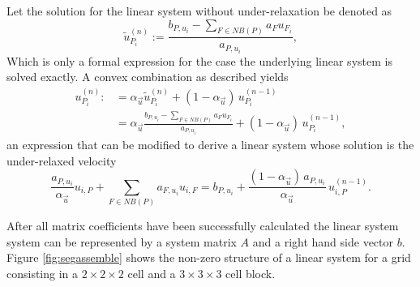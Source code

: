     Let  the solution for the linear system without under-relaxation be denoted as
    \begin{displaymath}
      \tilde{u}_{P_i}^{(n)} := \frac{b_{P,u_i} - \sum_{F \in NB(P)} a_F u_{F_i}}{a_{P,u_i}},
    \end{displaymath}
    Which is only a formal expression for the case the underlying linear system is solved exactly. A convex combination as described yields
    \begin{align*}
      u_{P_i}^{(n)} :&= \alpha_{\vec{u}} \tilde{u}_{P_i}^{(n)} + (1 - \alpha_{\vec{u}} )\, u_{P_i}^{(n-1)} \\[0.5em]
                     &= \alpha_{\vec{u}} \frac{b_{P,u_i} - \sum_{F \in NB(P)} a_F u_{F_i}}{a_{P,u_i}} + (1 - \alpha_{\vec{u}} )\, u_{P_i}^{(n-1)},
    \end{align*}
    an expression that can be modified to derive a linear system whose solution is the under-relaxed velocity
    \begin{displaymath}
      \frac{a_{P,u_i}}{\alpha_{\vec{u}}} u_{i,P} + \sum_{F \in NB(P)} a_{F,u_i} u_{i,F} 
      = 
      b_{P,u_i} + \frac{(1 - \alpha_{\vec{u}})\, a_{P,u_i}}{\alpha_{\vec{u}}}\, u_{i,P}^{(n-1)}. 
    \end{displaymath}

    After all matrix coefficients have been successfully calculated the linear system system can be represented by a system matrix \(A\) and a right hand side vector \(b\). Figure \ref{fig:segassemble} shows the non-zero structure of a linear system for a grid consisting in a \(2\times2\times2\) cell and a \(3\times3\times3\) cell block.


